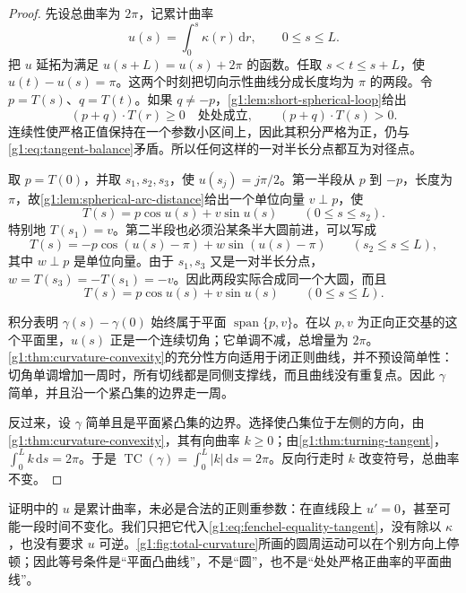 \begin{proof}
	先设总曲率为 \(2\pi\)，记累计曲率
	\[
		u(s)=\int_0^s\kappa(r)\,\mathrm{d}r,\qquad 0\le s\le L.
	\]
	把 \(u\) 延拓为满足 \(u(s+L)=u(s)+2\pi\) 的函数。任取 \(s<t\le s+L\)，使 \(u(t)-u(s)=\pi\)。这两个时刻把切向示性曲线分成长度均为 \(\pi\) 的两段。令 \(p=T(s)\)、\(q=T(t)\)。如果 \(q\ne-p\)，\cref{g1:lem:short-spherical-loop}给出
	\[
		(p+q)\cdot T(r)\ge0\quad\text{处处成立},
		\qquad (p+q)\cdot T(s)>0.
	\]
	连续性使严格正值保持在一个参数小区间上，因此其积分严格为正，仍与\eqref{g1:eq:tangent-balance}矛盾。所以任何这样的一对半长分点都互为对径点。

	取 \(p=T(0)\)，并取 \(s_1,s_2,s_3\)，使 \(u(s_j)=j\pi/2\)。第一半段从 \(p\) 到 \(-p\)，长度为 \(\pi\)，故\cref{g1:lem:spherical-arc-distance}给出一个单位向量 \(v\perp p\)，使
	\[
		T(s)=p\cos u(s)+v\sin u(s)\qquad(0\le s\le s_2).
	\]
	特别地 \(T(s_1)=v\)。第二半段也必须沿某条半大圆前进，可以写成
	\[
		T(s)=-p\cos(u(s)-\pi)+w\sin(u(s)-\pi)\qquad(s_2\le s\le L),
	\]
	其中 \(w\perp p\) 是单位向量。由于 \(s_1,s_3\) 又是一对半长分点，\(w=T(s_3)=-T(s_1)=-v\)。因此两段实际合成同一个大圆，而且
	\begin{equation}\label{g1:eq:fenchel-equality-tangent}
		T(s)=p\cos u(s)+v\sin u(s)\qquad(0\le s\le L).
	\end{equation}

	积分表明 \(\gamma(s)-\gamma(0)\) 始终属于平面 \(\operatorname{span}\{p,v\}\)。在以 \(p,v\) 为正向正交基的这个平面里，\(u(s)\) 正是一个连续切角；它单调不减，总增量为 \(2\pi\)。\cref{g1:thm:curvature-convexity}的充分性方向适用于闭正则曲线，并不预设简单性：切角单调增加一周时，所有切线都是同侧支撑线，而且曲线没有重复点。因此 \(\gamma\) 简单，并且沿一个紧凸集的边界走一周。

	反过来，设 \(\gamma\) 简单且是平面紧凸集的边界。选择使凸集位于左侧的方向，由\cref{g1:thm:curvature-convexity}，其有向曲率 \(k\ge0\)；由\cref{g1:thm:turning-tangent}，\(\int_0^L k\,\mathrm{d}s=2\pi\)。于是 \(\operatorname{TC}(\gamma)=\int_0^L|k|\,\mathrm{d}s=2\pi\)。反向行走时 \(k\) 改变符号，总曲率不变。
\end{proof}



证明中的 \(u\) 是累计曲率，未必是合法的正则重参数：在直线段上 \(u'=0\)，甚至可能一段时间不变化。我们只把它代入\eqref{g1:eq:fenchel-equality-tangent}，没有除以 \(\kappa\)，也没有要求 \(u\) 可逆。\cref{g1:fig:total-curvature}所画的圆周运动可以在个别方向上停顿；因此等号条件是“平面凸曲线”，不是“圆”，也不是“处处严格正曲率的平面曲线”。

